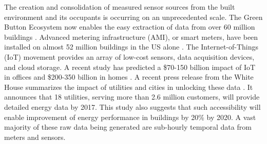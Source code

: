 The creation and consolidation of measured sensor sources from the built environment and its occupants is occurring on an unprecedented scale. The Green Button Ecosystem now enables the easy extraction of data from over 60 million buildings \cite{_green_????}. Advanced metering infrastructure (AMI), or smart meters, have been installed on almost 52 million buildings in the US alone \cite{energy_information_administration_how_2015}. The Internet-of-Things (IoT) movement provides an array of low-cost sensors, data acquisition devices, and cloud storage. A recent study has predicted a \$70-150 billion impact of IoT in offices and \$200-350 billion in homes \cite{james_manyika_unlocking_2015}. A recent press release from the White House summarizes the impact of utilities and cities in unlocking these data \cite{_fact_2016}. It announces that 18 utilities, serving more than 2.6 million customers, will provide detailed energy data by 2017. This study also suggests that such accessibility will enable improvement of energy performance in buildings by 20\% by 2020. A vast majority of these raw data being generated are sub-hourly temporal data from meters and sensors.